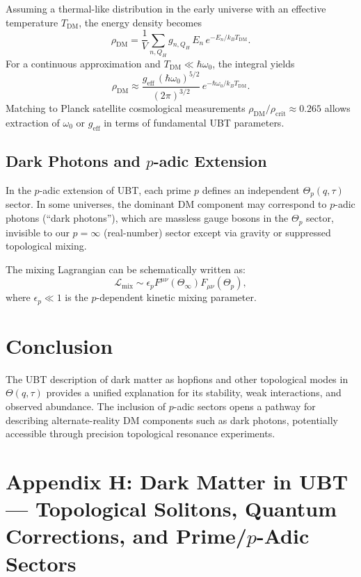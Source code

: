 \documentclass[12pt,a4paper]{article}
\numberwithin{equation}{section}
\theoremstyle{definition}
\theoremstyle{remark}
\begin{document}
Assuming a thermal-like distribution in the early universe with an effective temperature $T_{\mathrm{DM}}$, the energy density becomes
\begin{equation}
\rho_{\mathrm{DM}} = \frac{1}{V} \sum_{n,Q_H} g_{n,Q_H} \, E_n \, e^{-E_n/k_B T_{\mathrm{DM}}}.
\end{equation}
For a continuous approximation and $T_{\mathrm{DM}} \ll \hbar\omega_0$, the integral yields
\begin{equation}
\rho_{\mathrm{DM}} \approx \frac{g_{\mathrm{eff}} \, (\hbar\omega_0)^{5/2}}{(2\pi)^{3/2}} \, e^{-\hbar\omega_0/k_B T_{\mathrm{DM}}}.
\end{equation}
Matching to Planck satellite cosmological measurements $\rho_{\mathrm{DM}}/\rho_{\mathrm{crit}} \approx 0.265$ allows extraction of $\omega_0$ or $g_{\mathrm{eff}}$ in terms of fundamental UBT parameters.

\subsection{Dark Photons and $p$-adic Extension}
In the $p$-adic extension of UBT, each prime $p$ defines an independent $\Theta_p(q,\tau)$ sector. In some universes, the dominant DM component may correspond to $p$-adic photons (``dark photons''), which are massless gauge bosons in the $\Theta_p$ sector, invisible to our $p= \infty$ (real-number) sector except via gravity or suppressed topological mixing.

The mixing Lagrangian can be schematically written as:
\begin{equation}
\mathcal{L}_{\mathrm{mix}} \sim \epsilon_{p} F^{\mu\nu}(\Theta_{\infty}) F_{\mu\nu}(\Theta_p),
\end{equation}
where $\epsilon_{p} \ll 1$ is the $p$-dependent kinetic mixing parameter.

\section{Conclusion}
The UBT description of dark matter as hopfions and other topological modes in $\Theta(q,\tau)$ provides a unified explanation for its stability, weak interactions, and observed abundance. The inclusion of $p$-adic sectors opens a pathway for describing alternate-reality DM components such as dark photons, potentially accessible through precision topological resonance experiments.

\section{Appendix H: Dark Matter in UBT --- Topological Solitons, Quantum Corrections, and Prime/$p$-Adic Sectors}
\label{app:dm-consolidated}
\end{document}
